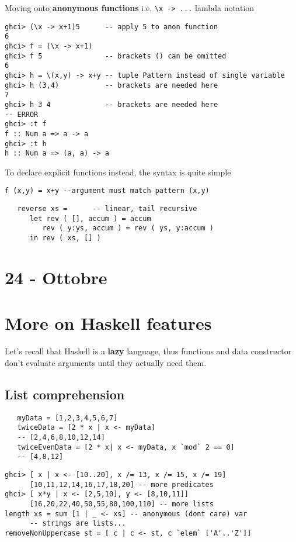 Moving onto \textbf{anonymous functions} i.e. \lstinline|\x -> ...| lambda notation
\begin{lstlisting}
ghci> (\x -> x+1)5      -- apply 5 to anon function
6
ghci> f = (\x -> x+1)
ghci> f 5               -- brackets () can be omitted
6
ghci> h = \(x,y) -> x+y -- tuple Pattern instead of single variable
ghci> h (3,4)           -- brackets are needed here
7
ghci> h 3 4             -- brackets are needed here
-- ERROR
ghci> :t f
f :: Num a => a -> a
ghci> :t h
h :: Num a => (a, a) -> a
\end{lstlisting}

To declare explicit functions instead, the syntax is quite simple
\begin{lstlisting}
f (x,y) = x+y --argument must match pattern (x,y)
\end{lstlisting}

\begin{lstlisting}
   reverse xs =      -- linear, tail recursive
      let rev ( [], accum ) = accum
         rev ( y:ys, accum ) = rev ( ys, y:accum )
      in rev ( xs, [] )
\end{lstlisting}


\section*{24 - Ottobre}
\section{More on Haskell features}
Let's recall that Haskell is a \textbf{lazy} language,
thus functions and data constructor don't evaluate arguments until they actually need them.

\subsection{List comprehension}

\begin{lstlisting}
   myData = [1,2,3,4,5,6,7]
   twiceData = [2 * x | x <- myData]
   -- [2,4,6,8,10,12,14]
   twiceEvenData = [2 * x| x <- myData, x `mod` 2 == 0]
   -- [4,8,12]
\end{lstlisting}

\begin{lstlisting}
ghci> [ x | x <- [10..20], x /= 13, x /= 15, x /= 19]
      [10,11,12,14,16,17,18,20] -- more predicates
ghci> [ x*y | x <- [2,5,10], y <- [8,10,11]]
      [16,20,22,40,50,55,80,100,110] -- more lists
length xs = sum [1 | _ <- xs] -- anonymous (dont care) var
      -- strings are lists...
removeNonUppercase st = [ c | c <- st, c `elem` ['A'..'Z']]
\end{lstlisting}

